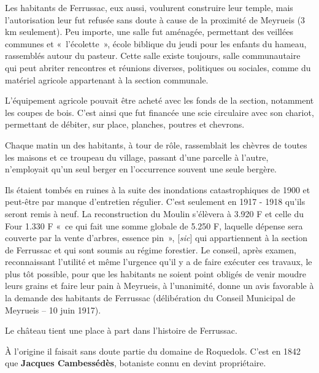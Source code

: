 Les habitants de Ferrussac, eux aussi, voulurent construire leur temple, mais l’autorisation leur fut
refusée sans doute à cause de la proximité de Meyrueis (3 km seulement). Peu importe, une salle fut
aménagée, permettant des veillées communes et «~l’écolette~», école biblique du jeudi pour les enfants
du hameau, rassemblés autour du pasteur. Cette salle existe toujours, salle communautaire qui peut
abriter rencontres et réunions diverses, politiques ou sociales, comme du matériel agricole appartenant
à la section communale.


L’équipement agricole pouvait être acheté avec les fonds de la section, notamment les coupes
de bois. C’est ainsi que fut financée une scie circulaire avec son chariot, permettant de débiter, sur
place, planches, poutres et chevrons.


Chaque matin un des habitants, à tour de rôle, rassemblait les chèvres de
toutes les maisons et ce troupeau du village, passant d’une parcelle à l’autre, n’employait qu’un seul
berger en l’occurrence souvent une seule bergère.


Ils étaient tombés en ruines à la suite des inondations catastrophiques
de 1900 et peut-être par manque d’entretien régulier. C’est seulement en 1917 - 1918 qu’ils seront
remis à neuf. La reconstruction du Moulin s’élèvera à 3.920 F et celle du Four 1.330 F «~ce qui fait une somme globale de 5.250 F, laquelle dépense sera couverte par la vente d’arbres,
essence pin~», [\textit{sic}] qui appartiennent à la section de Ferrussac et qui sont soumis au régime forestier. Le
conseil, après examen, reconnaissant l’utilité et même l’urgence qu’il y a de faire exécuter ces travaux,
le plus tôt possible, pour que les habitants ne soient point obligés de venir moudre leurs grains et faire
leur pain à Meyrueis, à l’unanimité, donne un avis favorable à la demande des habitants de Ferrussac
(délibération du Conseil Municipal de Meyrueis -- 10 juin 1917).


Le château tient une place à part dans l’histoire de Ferrussac.

À l’origine il faisait sans doute partie du domaine de Roquedols. C’est en 1842 que
\textbf{Jacques Cambessédès}, botaniste connu en devint propriétaire.

